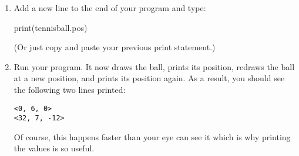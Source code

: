 \begin{enumerate}
	\item Add a new line to the end of your program and type:
	
\begin{myvpython}
print(tennisball.pos)
\end{myvpython}

(Or just copy and paste your previous print statement.)

	\item Run your program. It now draws the ball, prints its position, redraws the ball at a new position, and prints its position again. As a result, you should see the following two lines printed:
	
\begin{verbatim}
<0, 6, 0>
<32, 7, -12>
\end{verbatim}
	
	Of course, this happens faster than your eye can see it which is why printing the values is so useful.
		



%	



%



\end{enumerate}
